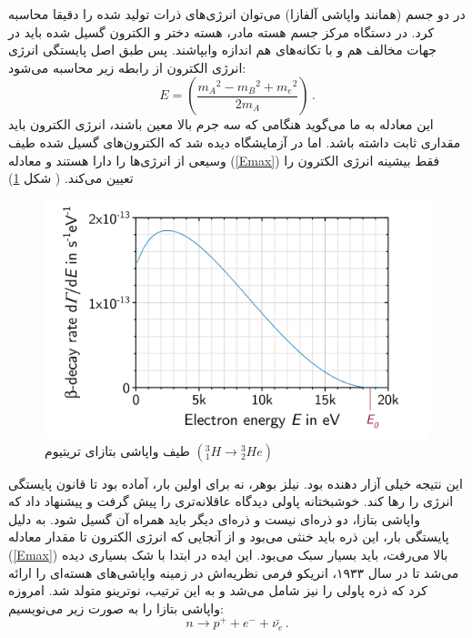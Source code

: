 \documentclass[a4paper,11pt,oneside,openany]{iut-thesis}
\begin{document}
در دو جسم (همانند واپاشی آلفازا) می‌توان انرژی‌های ذرات تولید شده را دقیقا محاسبه کرد. در دستگاه مرکز جسم هسته مادر، هسته دختر و الکترون گسیل شده باید در جهات مخالف هم و با تکانه‌های هم اندازه وابپاشند. پس طبق اصل پایستگی انرژی انرژی الکترون از رابطه زیر محاسبه می‌شود:
\begin{equation}\label{Emax}
E = (\frac{{m_{A}}^2 - {m_{B}}^2 + {m_{e}}^2}{2 m_{A}})\,.
\end{equation}
این معادله به ما می‌گوید هنگامی که سه جرم بالا معین باشند، انرژی الکترون باید مقداری ثابت داشته باشد.  اما در آزمایشگاه دیده شد که الکترون‌های گسیل شده طیف وسیعی از انرژی‌ها را دارا هستند و معادله 
(\ref{Emax}) 
فقط بیشینه انرژی الکترون را تعیین می‌کند. 
(
شکل 
\ref{betaspec})

\begin{figure}
	\includegraphics[angle=0,width=\textwidth,clip=0]{beta-spectrum}
	\caption{
		طیف واپاشی بتازای تریتیوم
		$({^{3}_{1}H} \rightarrow {^{3}_{2}He})$
	}
	\label{betaspec}
\end{figure}

این نتیجه خیلی آزار دهنده بود. نیلز بوهر، نه برای اولین بار، آماده بود تا قانون پایستگی انرژی را رها کند. خوشبختانه پاولی دیدگاه عاقلانه‌تری را پیش گرفت و پیشنهاد داد که واپاشی بتازا، دو ذره‌ای نیست و ذره‌ای دیگر باید همراه آن گسیل شود. به دلیل پایستگی بار، این ذره باید خنثی می‌بود و از آنجایی که انرژی الکترون تا مقدار معادله 
(\ref{Emax}) 
بالا می‌رفت، باید بسیار سبک می‌بود. این ایده در ابتدا با شک بسیاری دیده می‌شد تا در سال ۱۹۳۳، انریکو فرمی نظریه‌اش در زمینه واپاشی‌های هسته‌ای را ارائه کرد که ذره پاولی را نیز شامل می‌شد و به این ترتیب، نوترینو متولد شد. امروزه واپاشی بتازا را به صورت زیر می‌نویسیم:
\begin{equation}
n \rightarrow p^{+} + e^{-} + \bar{\nu_{e}}\,.
\end{equation}
\end{document}
